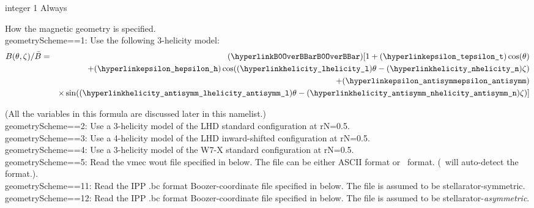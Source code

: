 {integer}
{1}
{Always}
{How the magnetic geometry is specified.\\

{\ttfamily geometryScheme}==1: Use the following 3-helicity model:\\
\begin{eqnarray}
\label{eq:Bmodel}
B(\theta,\zeta)/\bar{B} 
&=& (\mbox{\parlink{B0OverBBar}}) [1 + (\mbox{\parlink{epsilon\_t}}) \cos(\theta) \\
&& + (\mbox{\parlink{epsilon\_h}}) \cos((\mbox{\parlink{helicity\_l}}) \theta - (\mbox{\parlink{helicity\_n}}) \zeta) \nonumber \\
&&  + (\mbox{\parlink{epsilon\_antisymm}}) \nonumber \\
&& \times \sin((\mbox{\parlink{helicity\_antisymm\_l}}) \theta - (\mbox{\parlink{helicity\_antisymm\_n}}) \zeta)] \nonumber
\end{eqnarray}

(All the variables in this formula are discussed later in this namelist.)\\

{\ttfamily geometryScheme}==2: Use a 3-helicity model of the LHD standard configuration at {\ttfamily rN}=0.5.\\

{\ttfamily geometryScheme}==3: Use a 4-helicity model of the LHD inward-shifted configuration at {\ttfamily rN}=0.5.\\

{\ttfamily geometryScheme}==4: Use a 3-helicity model of the W7-X standard configuration at {\ttfamily rN}=0.5.\\

{\ttfamily geometryScheme}==5: Read the {\ttfamily vmec wout} file specified in  below. The file can be
       either ASCII format or \netCDF~format. (\sfincs~will auto-detect the format.).\\

{\ttfamily geometryScheme}==11: Read the IPP {\ttfamily .bc} format Boozer-coordinate file specified in  below. 
The file is assumed to be stellarator-symmetric.\\

{\ttfamily geometryScheme}==12: Read the IPP {\ttfamily .bc} format Boozer-coordinate file specified in  below. 
The file is assumed to be stellarator-\emph{asymmetric}.
}

\myhrule

